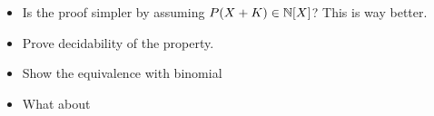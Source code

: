 \documentclass[sigconf,natbib=false,screen, review,anonymous]{acmart}
\begin{document}
\begin{itemize}
    \item Is the proof simpler by assuming
        $P(X + K) \in \mathbb{N}[X]$? This is way better.
    
    \item Prove decidability of the property.

    \item Show the equivalence with binomial

    \item What about 
\end{itemize}








\printbibliography

\appendix
\end{document}
